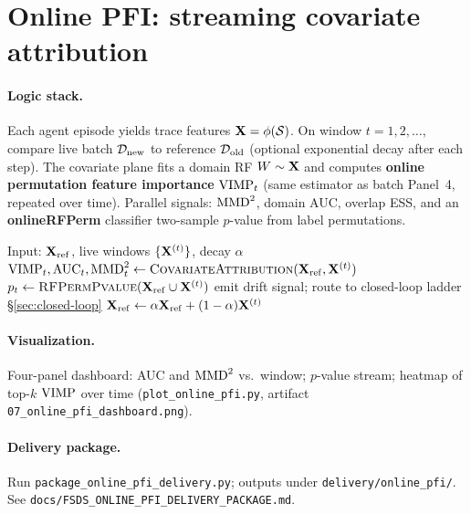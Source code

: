 \section{Online PFI: streaming covariate attribution}
\label{sec:online-pfi}

\paragraph{Logic stack.}
Each agent episode yields trace features $\mathbf{X}=\phi(\mathcal{S})$.
On window $t=1,2,\ldots$, compare live batch $\mathcal{D}_{\mathrm{new}}$ to reference $\mathcal{D}_{\mathrm{old}}$
(optional exponential decay after each step).
The covariate plane fits a domain RF $W\sim \mathbf{X}$ and computes
\textbf{online permutation feature importance} $\mathrm{VIMP}_t$ (same estimator as
batch Panel~4, repeated over time).
Parallel signals: $\mathrm{MMD}^2$, domain AUC, overlap ESS, and an
\textbf{onlineRFPerm} classifier two-sample $p$-value from label permutations.

\begin{algorithm}[t]
\caption{Online PFI stream (implementation: \texttt{online\_pfi.py})}
\label{alg:online-pfi}
\begin{algorithmic}[1]
\STATE Input: $\mathbf{X}_{\mathrm{ref}}$, live windows $\{\mathbf{X}^{(t)}\}$, decay $\alpha$
  \STATE $\mathrm{VIMP}_t, \mathrm{AUC}_t, \mathrm{MMD}^2_t \leftarrow \textsc{CovariateAttribution}(\mathbf{X}_{\mathrm{ref}}, \mathbf{X}^{(t)})$
  \STATE $p_t \leftarrow \textsc{RFPermPvalue}(\mathbf{X}_{\mathrm{ref}} \cup \mathbf{X}^{(t)})$
    \STATE emit drift signal; route to closed-loop ladder \S\ref{sec:closed-loop}
  \ENDIF
  \STATE $\mathbf{X}_{\mathrm{ref}} \leftarrow \alpha \mathbf{X}_{\mathrm{ref}} + (1-\alpha)\mathbf{X}^{(t)}$
\ENDFOR
\end{algorithmic}
\end{algorithm}

\paragraph{Visualization.}
Four-panel dashboard: AUC and $\mathrm{MMD}^2$ vs.\ window; $p$-value stream;
heatmap of top-$k$ $\mathrm{VIMP}$ over time
(\texttt{plot\_online\_pfi.py}, artifact \texttt{07\_online\_pfi\_dashboard.png}).

\paragraph{Delivery package.}
Run \texttt{package\_online\_pfi\_delivery.py}; outputs under
\texttt{delivery/online\_pfi/}. See \texttt{docs/FSDS\_ONLINE\_PFI\_DELIVERY\_PACKAGE.md}.
